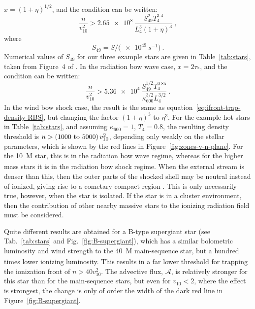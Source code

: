 \(x = (1 + \eta)^{1/2}\), and the condition can be written:
\begin{equation}
  \label{eq:ifront-trap-density-RBS}
  \frac{n}{v_{10}^2} > \num{2.65e8} \, \frac{S_{49}^2 T_4^{3.4}}{L_4^3 (1 + \eta)^3} \ , 
\end{equation}
where
\begin{equation*}
  S_{49} = S / \bigl( \SI{e49}{s^{-1}} \bigr) \ .
\end{equation*}
Numerical values of \(S_{49}\) for our three example stars are given
in Table~\ref{tab:stars}, taken from Figure~4 of
\citet{Sternberg:2003a}.  In the radiation bow wave case,
\(x = 2\tau_*\), and the condition can be written:
\begin{equation}
  \label{eq:ifront-trap-taustar-RBW}
  \frac{n}{v_{10}^2} > \num{5.36e4} \, \frac{S_{49}^{1/2} T_4^{0.85} }{\kappa_{600}^{3/2} L_4^{3/2}} \ . 
\end{equation}
In the wind bow shock case, the result is the same as
equation~\eqref{eq:ifront-trap-density-RBS}, but changing the factor
\((1 + \eta)^3\) to \(\eta^3\).  For the example hot stars in
Table~\ref{tab:stars}, and assuming \(\kappa_{600} = 1\),
\(T_4 = 0.8\), the resulting density threshold is
\(n > (\text{\numrange{1000}{5000}})\, v_{10}^2\), depending only
weakly on the stellar parameters, which is shown by the red lines in
Figure~\ref{fig:zones-v-n-plane}.  For the \SI{10}{M_\odot} star, this is
in the radiation bow wave regime, whereas for the higher mass stars it
is in the radiation bow shock regime.  When the external stream is
denser than this, then the outer parts of the shocked shell may be
neutral instead of ionized, giving rise to a cometary compact \hii{}
region \citep{Mac-Low:1991a, Arthur:2006a}.  This is only necessarily
true, however, when the star is isolated.  If the star is in a cluster
environment, then the contribution of other nearby massive stars to
the ionizing radiation field must be considered.

Quite different results are obtained for a B-type supergiant star (see
Tab.~\ref{tab:stars} and Fig.~\ref{fig:B-supergiant}), which has a
similar bolometric luminosity and wind strength to the \SI{40}{M_\odot}
main-sequence star, but a hundred times lower ionizing luminosity.
This results in a far lower threshold for trapping the ionization
front of \(n > 40 v_{10}^2\).  The advective flux, \(\mathcal{A}\), is
relatively stronger for this star than for the main-sequence stars, but
even for \(v_{10} < 2\), where the effect is strongest, the change is
only of order the width of the dark red line in
Figure~\ref{fig:B-supergiant}.


